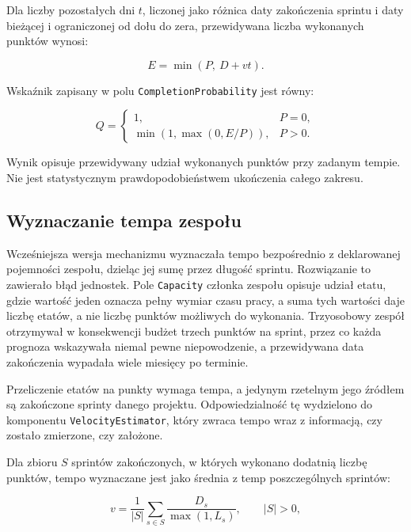 Dla liczby pozostałych dni \(t\), liczonej jako różnica daty zakończenia sprintu i daty bieżącej i ograniczonej od dołu do zera, przewidywana liczba wykonanych punktów wynosi:

\begin{equation}
    E = \min(P,\ D+vt).
    \label{eq:sprint-punkty}
\end{equation}

Wskaźnik zapisany w polu \texttt{CompletionProbability} jest równy:

\begin{equation}
    Q =
    \begin{cases}
        1, & P=0,\\
        \min(1,\max(0,E/P)), & P>0.
    \end{cases}
    \label{eq:sprint-wskaznik}
\end{equation}

Wynik opisuje przewidywany udział wykonanych punktów przy zadanym tempie. Nie jest statystycznym prawdopodobieństwem ukończenia całego zakresu.

\subsection{Wyznaczanie tempa zespołu}
\label{subsec:velocity-estimator}

Wcześniejsza wersja mechanizmu wyznaczała tempo bezpośrednio z deklarowanej pojemności zespołu, dzieląc jej sumę przez długość sprintu. Rozwiązanie to zawierało błąd jednostek. Pole \texttt{Capacity} członka zespołu opisuje udział etatu, gdzie wartość jeden oznacza pełny wymiar czasu pracy, a suma tych wartości daje liczbę etatów, a nie liczbę punktów możliwych do wykonania. Trzyosobowy zespół otrzymywał w konsekwencji budżet trzech punktów na sprint, przez co każda prognoza wskazywała niemal pewne niepowodzenie, a przewidywana data zakończenia wypadała wiele miesięcy po terminie.

Przeliczenie etatów na punkty wymaga tempa, a jedynym rzetelnym jego źródłem są zakończone sprinty danego projektu. Odpowiedzialność tę wydzielono do komponentu \texttt{VelocityEstimator}, który zwraca tempo wraz z informacją, czy zostało zmierzone, czy założone.

Dla zbioru \(S\) sprintów zakończonych, w których wykonano dodatnią liczbę punktów, tempo wyznaczane jest jako średnia z temp poszczególnych sprintów:

\begin{equation}
    v = \frac{1}{|S|}\sum_{s \in S} \frac{D_s}{\max(1, L_s)},
    \qquad |S| > 0,
    \label{eq:velocity-zmierzone}
\end{equation}

